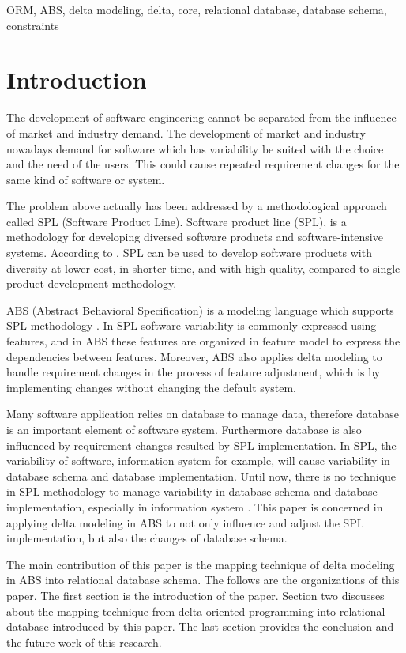 \documentclass[conference]{IEEEtran}
\begin{document}
\begin{IEEEkeywords}
ORM, ABS, delta modeling, delta, core, relational database, database schema, constraints
\end{IEEEkeywords}


\section{Introduction}
The development of software engineering cannot be separated from the influence of market and industry demand. The development of market and industry nowadays demand for software which has variability be suited with the choice and the need of the users. This could cause repeated requirement changes for the same kind of software or system.

The problem above actually has been addressed by a methodological approach called SPL (Software Product Line). Software product line (SPL), is a methodology for developing diversed software products and software-intensive systems. According to \cite{book1}, SPL can be used to develop software products with diversity at lower cost, in shorter time, and with high quality, compared to single product development methodology.

ABS (Abstract Behavioral Specification) is a modeling language which supports SPL methodology \cite{lncschap}. In SPL software variability is commonly expressed using features, and in ABS these features are organized in feature model to express the dependencies between features. Moreover, ABS also applies delta modeling to handle requirement changes in the process of feature adjustment, which is by implementing changes without changing the default system.

Many software application relies on database to manage data, therefore database is an important element of software system. Furthermore database is also influenced by requirement changes resulted by SPL implementation. In SPL, the variability of software, information system for example, will cause variability in database schema and database implementation. Until now, there is no technique in SPL methodology to manage variability in database schema and database implementation, especially in information system \cite{article}. This paper is concerned in applying delta modeling in ABS to not only influence and adjust the  SPL implementation, but also the changes of database schema.

The main contribution of this paper is the mapping technique of delta modeling in ABS into relational database schema. The follows are the organizations of this paper.
The first section is the introduction of the paper.
Section two discusses about the mapping technique from delta oriented programming into relational database introduced by this paper.
The last section provides the conclusion and the future work of this research.
\end{document}
